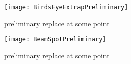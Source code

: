 \begin{figure}[]
    \label{fig:BirdsEyeExtrapPreliminary}
	\centering
	\texttt{[image: BirdsEyeExtrapPreliminary]}
    \caption[Birds Eye View of Extrapolation]{preliminary replace at some point}    
\end{figure}

\begin{figure}[]
    \label{fig:BeamSpotPreliminary}
	\centering
	\texttt{[image: BeamSpotPreliminary]}
    \caption[Beam spot extrapolation]{preliminary replace at some point}    
\end{figure}


